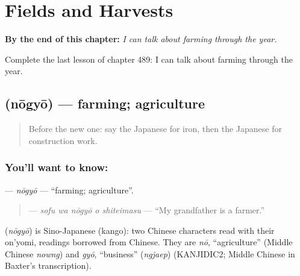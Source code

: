 
\chapter{Fields and Harvests}
\label{ch:ja-fields-and-harvests}

\begin{chapteropening}
\textbf{By the end of this chapter:} \emph{I can talk about farming through the year.}

Complete the last lesson of chapter 489: I can talk about farming through the year.
\end{chapteropening}

\section[\texorpdfstring{\ja{のうぎょう} (nōgyō)}{のうぎょう (nōgyō)}]{ (nōgyō) — farming; agriculture}

\label{lesson:JA-C489-nougyou}



\begin{quote}
Before the new one: say the Japanese for iron, then the Japanese for construction work.
\end{quote}

\subsection*{You'll want to know: }
\textbf{} — \emph{nōgyō} — \textquotedblleft{}farming; agriculture\textquotedblright{}.

\begin{quote}
\textbf{  } — \emph{sofu wa nōgyō o shiteimasu} — \textquotedblleft{}My grandfather is a farmer.\textquotedblright{}
\end{quote}

\begin{cousinweb}
\textbf{} (\emph{nōgyō}) is Sino-Japanese (kango): two Chinese characters read with their on'yomi, readings borrowed from Chinese. They are \emph{nō}, \textquotedblleft{}agriculture\textquotedblright{} (Middle Chinese \emph{nowng}) and \emph{gyō}, \textquotedblleft{}business\textquotedblright{} (\emph{ngjaep}) (KANJIDIC2; Middle Chinese in Baxter's transcription).
\end{cousinweb}

